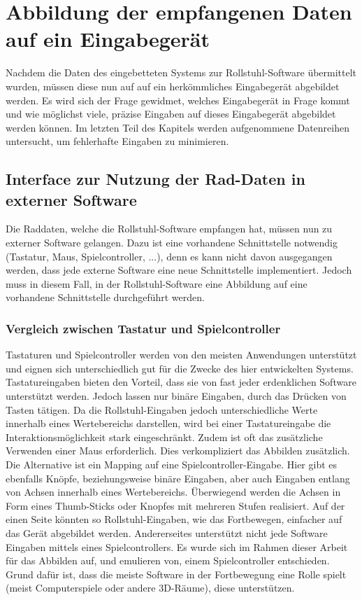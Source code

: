 \chapter{Abbildung der empfangenen Daten auf ein Eingabegerät}
Nachdem die Daten des eingebetteten Systems zur Rollstuhl-Software übermittelt wurden, müssen diese nun auf auf ein herkömmliches Eingabegerät abgebildet werden.
Es wird sich der Frage gewidmet, welches Eingabegerät in Frage kommt und wie möglichst viele, präzise Eingaben auf dieses Eingabegerät abgebildet werden können.
Im letzten Teil des Kapitels werden aufgenommene Datenreihen untersucht, um fehlerhafte Eingaben zu minimieren.

\section{Interface zur Nutzung der Rad-Daten in externer Software}
Die Raddaten, welche die Rollstuhl-Software empfangen hat, müssen nun zu externer Software gelangen.
Dazu ist eine vorhandene Schnittstelle notwendig (Tastatur, Maus, Spielcontroller, ...), denn es kann nicht davon ausgegangen werden, dass jede externe Software eine neue Schnittstelle implementiert.
Jedoch muss in diesem Fall, in der Rollstuhl-Software eine Abbildung auf eine vorhandene Schnittstelle durchgeführt werden.

\subsection{Vergleich zwischen Tastatur und Spielcontroller}
Tastaturen und Spielcontroller werden von den meisten Anwendungen unterstützt und eignen sich unterschiedlich gut für die Zwecke des hier entwickelten Systems.
Tastatureingaben bieten den Vorteil, dass sie von fast jeder erdenklichen Software unterstützt werden. Jedoch lassen nur binäre Eingaben, durch das Drücken von Tasten tätigen.
Da die Rollstuhl-Eingaben jedoch unterschiedliche Werte innerhalb eines Wertebereichs darstellen, wird bei einer Tastatureingabe die Interaktionsmöglichkeit stark eingeschränkt.
Zudem ist oft das zusätzliche Verwenden einer Maus erforderlich. Dies verkompliziert das Abbilden zusätzlich.
Die Alternative ist ein Mapping auf eine Spielcontroller-Eingabe.
Hier gibt es ebenfalls Knöpfe, beziehungsweise binäre Eingaben, aber auch Eingaben entlang von Achsen innerhalb eines Wertebereichs.
Überwiegend werden die Achsen in Form eines Thumb-Sticks oder Knopfes mit mehreren Stufen realisiert.
Auf der einen Seite könnten so Rollstuhl-Eingaben, wie das Fortbewegen, einfacher auf das Gerät abgebildet werden.
Andererseites unterstützt nicht jede Software Eingaben mittels eines Spielcontrollers.
Es wurde sich im Rahmen dieser Arbeit für das Abbilden auf, und emulieren von, einem Spielcontroller entschieden.
Grund dafür ist, dass die meiste Software in der Fortbewegung eine Rolle spielt (meist Computerspiele oder andere 3D-Räume), diese unterstützen.

